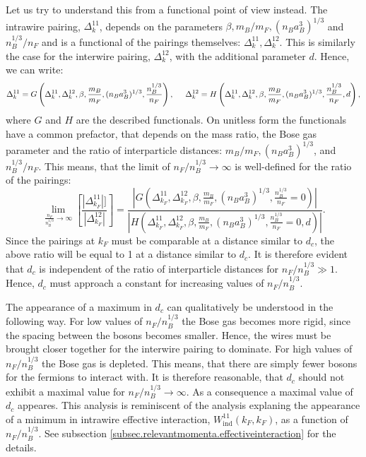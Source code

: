 Let us try to understand this from a functional point of view instead. The intrawire pairing, $\Delta^{11}_k$, depends on the parameters $\beta, m_B/m_F, (n_Ba_B^3)^{1/3}$ and $n_B^{1/3}/n_F$ and is a functional of the pairings themselves: $\Delta^{11}_k, \Delta^{12}_k$. This is similarly the case for the interwire pairing, $\Delta^{12}_k$, with the additional parameter $d$. Hence, we can write:
\begin{equation}
\Delta^{11}_k = G\left(\Delta^{11}_k, \Delta^{12}_k, \beta, \frac{m_B}{m_F}, (n_Ba_B^3)^{1/3}, \frac{n_B^{1/3}}{n_F} \right), \hspace{0.5cm} \Delta^{12}_k = H\left(\Delta^{11}_k, \Delta^{12}_k, \beta, \frac{m_B}{m_F}, (n_Ba_B^3)^{1/3}, \frac{n_B^{1/3}}{n_F}, d \right), \nonumber 
\end{equation}
where $G$ and $H$ are the described functionals. On unitless form the functionals have a common prefactor, that depends on the mass ratio, the Bose gas parameter and the ratio of interparticle distances: $m_B/m_F, (n_Ba_B^3)^{1/3}$, and $n_B^{1/3}/n_F$. This means, that the limit of $n_F/n_B^{1/3} \to \infty $ is well-defined for the ratio of the pairings:
\begin{equation}
\lim_{\frac{n_F}{n_B^{1/3}} \to \infty} \left[\frac{|\Delta^{11}_{k_F}|]}{|\Delta^{12}_{k_F}|}\right] = \frac{\left|G\left(\Delta^{11}_{k_F}, \Delta^{12}_{k_F}, \beta, \frac{m_B}{m_F}, (n_Ba_B^3)^{1/3}, \frac{n_B^{1/3}}{n_F} = 0 \right)\right|}{\left|H\left(\Delta^{11}_{k_F}, \Delta^{12}_{k_F}, \beta, \frac{m_B}{m_F}, (n_Ba_B^3)^{1/3}, \frac{n_B^{1/3}}{n_F} = 0, d \right)\right|}. \nonumber
\end{equation}
Since the pairings at $k_F$ must be comparable at a distance similar to $d_c$, the above ratio will be equal to 1 at a distance similar to $d_c$. It is therefore evident that $d_c$ is independent of the ratio of interparticle distances for $n_F/n_B^{1/3} \gg 1$. Hence, $d_c$ must approach a constant for increasing values of $n_F/n_B^{1/3}$. 

The appearance of a maximum in $d_c$ can qualitatively be understood in the following way. For low values of $n_F/n_B^{1/3}$ the Bose gas becomes more rigid, since the spacing between the bosons becomes smaller. Hence, the wires must be brought closer together for the interwire pairing to dominate. For high values of $n_F/n_B^{1/3}$ the Bose gas is depleted. This means, that there are simply fewer bosons for the fermions to interact with. It is therefore reasonable, that $d_c$ should not exhibit a maximal value for $n_F/n_B^{1/3} \to \infty$. As a consequence a maximal value of $d_c$ appeares. This analysis is reminiscent of the analysis explaning the appearance of a minimum in intrawire effective interaction, $W_\text{ind}^{11}(k_F,k_F)$, as a function of $n_F/n_B^{1/3}$. See subsection \ref{subsec.relevantmomenta.effectiveinteraction} for the details.  



